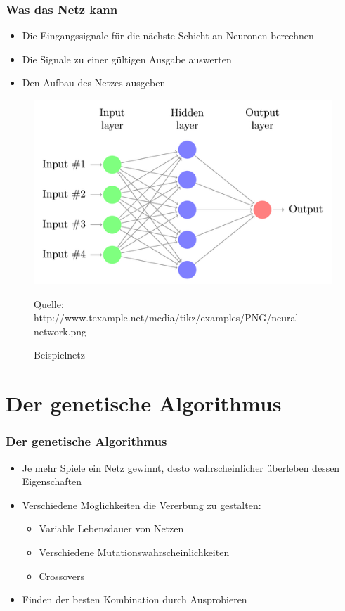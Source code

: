 \documentclass[compress]{beamer}
\begin{document}
\begin{frame}
	\frametitle{Was das Netz kann}
	
	\begin{itemize}
		\item Die Eingangssignale für die nächste Schicht an Neuronen berechnen
		\item Die Signale zu einer gültigen Ausgabe auswerten
		\item Den Aufbau des Netzes ausgeben
	\end{itemize}
	
	\begin{figure}
		\begin{center}
			\includegraphics[scale=0.25]{net.png}
		\end{center}
		\caption{Beispielnetz}
		\begin{footnotesize}
		Quelle: http://www.texample.net/media/tikz/examples/PNG/neural-network.png
		\end{footnotesize}
		\label{fig:Netz}
	\end{figure}
	
\end{frame}

\section{Der genetische Algorithmus}
\begin{frame}
	\frametitle{Der genetische Algorithmus}

	\begin{itemize}
		\item Je mehr Spiele ein Netz gewinnt, desto wahrscheinlicher überleben dessen Eigenschaften
		\item Verschiedene Möglichkeiten die Vererbung zu gestalten:

		\begin{itemize}
			\item Variable Lebensdauer von Netzen
			\item Verschiedene Mutationswahrscheinlichkeiten
			\item Crossovers
		\end{itemize}
		
		\item Finden der besten Kombination durch Ausprobieren
	\end{itemize}
\end{frame}

\end{document}
